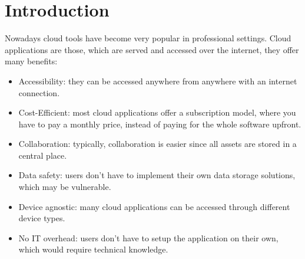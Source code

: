 \chapter{Introduction}
\label{cha:introduction}





Nowadays cloud tools have become very popular in professional settings.
Cloud applications are those, which are served and accessed over the internet, they offer many benefits:

\begin{itemize}
    \item Accessibility: they can be accessed anywhere from anywhere with an internet connection.
    \item Cost-Efficient: most cloud applications offer a subscription model, where you have to pay a monthly price, instead of paying for the whole software upfront.
    \item Collaboration: typically, collaboration is easier since all assets are stored in a central place.
    \item Data safety: users don't have to implement their own data storage solutions, which may be vulnerable.
    \item Device agnostic: many cloud applications can be accessed through different device types.  
    \item No IT overhead: users don't have to setup the application on their own, which would require technical knowledge.
\end{itemize}

